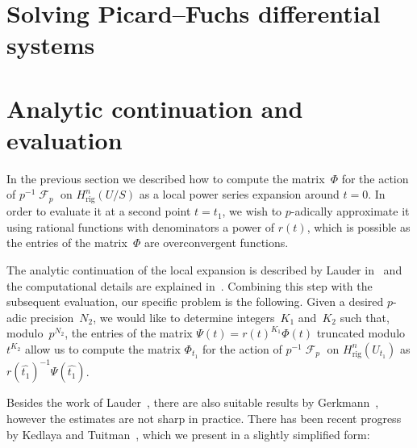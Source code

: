 \documentclass[a4paper,11pt]{article}
\numberwithin{equation}{section}
\DeclareMathOperator{\Frob}{\mathcal{F}} %
\providecommand{\Hrig}{H_{\text{rig}}}  %
\theoremstyle{definition}
\begin{document}

\section{Solving Picard--Fuchs differential systems}
\label{sec:DifferentialSystem}


\section{Analytic continuation and evaluation}
\label{sec:Evaluation}

In the previous section we described how to compute the matrix~$\Phi$ 
for the action of $p^{-1} \Frob_p$ on $\Hrig^{n}(U/S)$ 
as a local power series expansion around $t = 0$.  In order to evaluate it 
at a second point $t = t_1$, we wish to $p$-adically approximate it 
using rational functions with denominators a power of $r(t)$, which 
is possible as the entries of the matrix~$\Phi$ are overconvergent 
functions.

The analytic continuation of the local expansion is described by Lauder 
in~\citep[\S 5.2]{Lauder2006} and the computational details are explained 
in~\citep[\S 8.1]{Lauder2004a}.  Combining this step with the subsequent 
evaluation, our specific problem is the following.  Given a desired 
$p$-adic precision~$N_2$, we would like to determine integers~$K_1$ 
and~$K_2$ such that, modulo~$p^{N_2}$, the entries of the matrix 
$\Psi(t) = r(t)^{K_1} \Phi(t)$ truncated modulo~$t^{K_2}$ allow us to 
compute the matrix $\Phi_{t_1}$ for the action of $p^{-1} \Frob_p$ 
on $\Hrig^{n}(U_{t_1})$ as $r(\hat{t_1})^{-1} \Psi(\hat{t_1})$.

Besides the work of Lauder~\citep[\S 8.1]{Lauder2004a}, there are also 
suitable results by Gerkmann~\citep[\S 6]{Gerkmann2007}, however the 
estimates are not sharp in practice.  There has been recent progress by 
Kedlaya and Tuitman~\citep[Theorem~2.1]{KedlayaTuitman2012}, which we 
present in a slightly simplified form:
\end{document}
